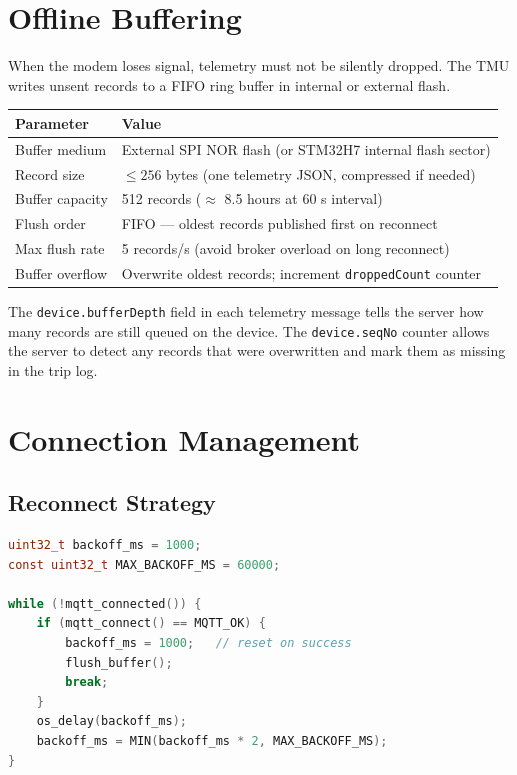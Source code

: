 \documentclass{article}
\begin{document}
\section{Offline Buffering}
\label{sec:buffer}

When the modem loses signal, telemetry must not be silently dropped. The TMU
writes unsent records to a FIFO ring buffer in internal or external flash.

\begin{center}
\begin{tabular}{ll}
\toprule
\textbf{Parameter} & \textbf{Value}\\
\midrule
Buffer medium        & External SPI NOR flash (or STM32H7 internal flash sector)\\
Record size          & $\leq 256$ bytes (one telemetry JSON, compressed if needed)\\
Buffer capacity      & 512 records ($\approx$ 8.5 hours at 60 s interval)\\
Flush order          & FIFO --- oldest records published first on reconnect\\
Max flush rate       & 5 records/s (avoid broker overload on long reconnect)\\
Buffer overflow      & Overwrite oldest records; increment \texttt{droppedCount} counter\\
\bottomrule
\end{tabular}
\end{center}

The \texttt{device.bufferDepth} field in each telemetry message tells the server
how many records are still queued on the device. The \texttt{device.seqNo}
counter allows the server to detect any records that were overwritten and
mark them as missing in the trip log.

\section{Connection Management}

\subsection{Reconnect Strategy}

\begin{lstlisting}[language=c, caption=Reconnect backoff (pseudocode)]
uint32_t backoff_ms = 1000;
const uint32_t MAX_BACKOFF_MS = 60000;

while (!mqtt_connected()) {
    if (mqtt_connect() == MQTT_OK) {
        backoff_ms = 1000;   // reset on success
        flush_buffer();
        break;
    }
    os_delay(backoff_ms);
    backoff_ms = MIN(backoff_ms * 2, MAX_BACKOFF_MS);
}
\end{lstlisting}
\end{document}
